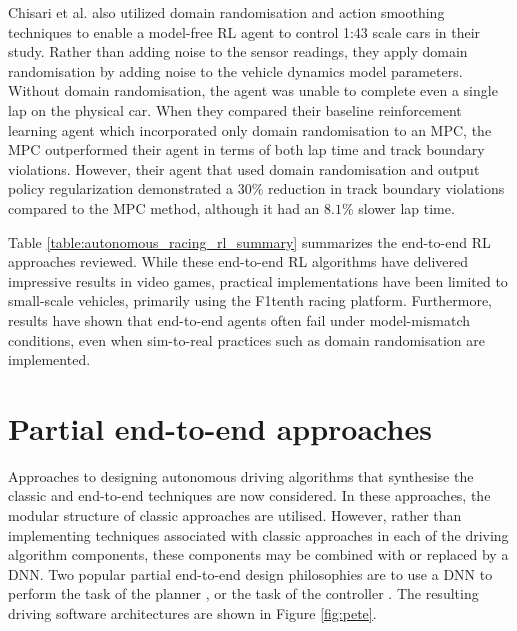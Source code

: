 Chisari et al. \cite{Chisari2021} also utilized domain randomisation and action smoothing techniques to enable a model-free RL agent to control 1:43 scale cars in their study. 
Rather than adding noise to the sensor readings, they apply domain randomisation by adding noise to the vehicle dynamics model parameters.
Without domain randomisation, the agent was unable to complete even a single lap on the physical car. 
When they compared their baseline reinforcement learning agent which incorporated only domain randomisation to an MPC, the MPC outperformed their agent in terms of both lap time and track boundary violations. 
However, their agent that used domain randomisation and output policy regularization demonstrated a $30\%$ reduction in track boundary violations compared to the MPC method, although it had an $8.1\%$ slower lap time.

Table \ref{table:autonomous_racing_rl_summary} summarizes the end-to-end RL approaches reviewed. 
While these end-to-end RL algorithms have delivered impressive results in video games, practical implementations have been limited to small-scale vehicles,
primarily using the F1tenth racing platform. 
Furthermore, results have shown that end-to-end agents often fail under model-mismatch conditions, even when sim-to-real practices such as domain randomisation are implemented.




\section{Partial end-to-end approaches}
\label{sec:partial_end_to_end}

Approaches to designing autonomous driving algorithms that synthesise the classic and end-to-end techniques are now considered. 
In these approaches, the modular structure of classic approaches are utilised.
However, rather than implementing techniques associated with classic approaches in each of the driving algorithm components, these components may be combined with or replaced by a DNN.
Two popular partial end-to-end design philosophies are to use a DNN to perform the task of the planner \cite{Capo2020, Weiss2020, Weiss2020a, Mahmoud2020}, or the task of the controller \cite{Ghignone2022, Evans2021b}.
The resulting driving software architectures are shown in Figure \ref{fig:pete}.

